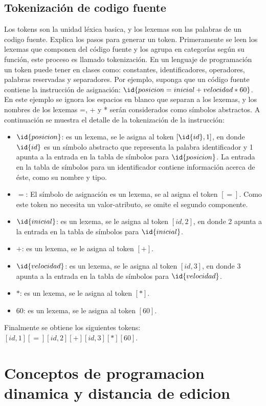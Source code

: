 \subsection{Tokenización de codigo fuente}
Los tokens son la unidad léxica basica, y los lexemas son las palabras de un codigo fuente. \cite{Aho2008} Explica los pasos para generar un token. Primeramente se leen los lexemas que componen del código fuente y los agrupa en categorías según su función, este proceso es llamado tokenización. En un lenguaje de programación un token puede tener en clases como: constantes, identificadores, operadores, palabras reservadas y separadores. Por ejemplo, suponga que un código fuente contiene la instrucción de asignación: $\id{posicion = inicial + velocidad * 60}$. En este ejemplo se ignora los espacios en blanco que separan a los lexemas, y los nombres de los lexemas =, + y * serán considerados como símbolos abstractos. A continuación se muestra el detalle de la tokenización de la instrucción:
\begin{itemize}
    \item $\id{posicion}$: es un lexema, se le asigna al token $[\id{id}, 1]$, en donde $\id{id}$ es un símbolo abstracto que representa la palabra identificador y 1 apunta a la entrada en la tabla de símbolos para $\id{posicion}$. La entrada en la tabla de símbolos para un identificador contiene información acerca de éste, como su nombre y tipo.
    \item $=$: El símbolo de asignación es un lexema, se al asigna el token $[=]$. Como este token no necesita un valor-atributo, se omite el segundo componente.
    \item $\id{inicial}$: es un lexema, se le asigna al token $[id, 2]$, en donde 2 apunta a la entrada en la tabla de símbolos para $\id{inicial}$.
    \item $+$: es un lexema, se le asigna al token $[+]$.
    \item $\id{velocidad}$: es un lexema, se le asigna al token $[id, 3]$, en donde 3 apunta a la entrada en la tabla de símbolos para $\id{velocidad}$.
    \item $*$: es un lexema, se le asigna al token $[*]$.
    \item $60$: es un lexema, se le asigna al token $[60]$.
\end{itemize}

\noindent Finalmente se obtiene los siguientes tokens: $[id, 1] [=] [id, 2] [+] [id, 3] [*] [60]$.

\section{Conceptos de programacion dinamica y distancia de edicion}
